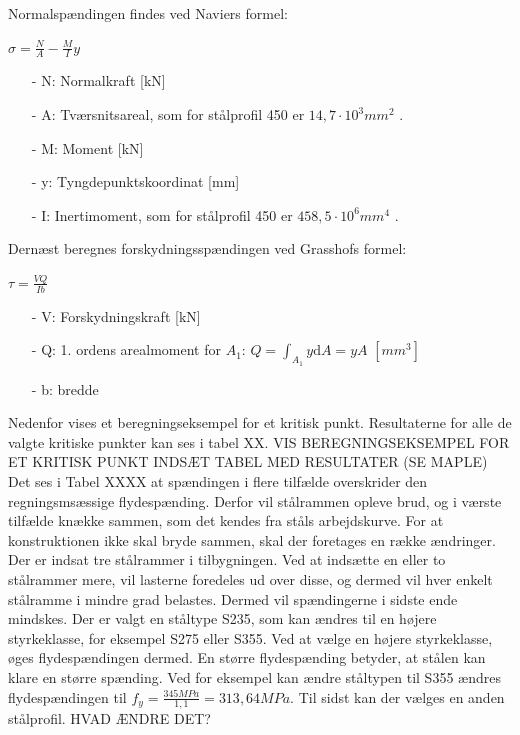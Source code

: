 Normalspændingen findes ved Naviers formel:

\begin{center}
	$\sigma = \frac{N}{A} - \frac{M}{I} y$
\end{center}

\begin{itemize}
	\item[-] N: Normalkraft [kN]
	\item[-] A: Tværsnitsareal, som for stålprofil 450 er $14,\!7 \cdot 10^3 mm^2$ \citep{stabi}. 
	\item[-] M: Moment [kN]
	\item[-] y: Tyngdepunktskoordinat [mm]
	\item[-] I: Inertimoment, som for stålprofil 450 er $458,\!5 \cdot 10^6 mm^4$ \citep{stabi}. 
\end{itemize} 

Dernæst beregnes forskydningsspændingen ved Grasshofs formel:

\begin{center}
	$\tau = \frac{VQ}{Ib}$
\end{center}

\begin{itemize}
	\item[-] V: Forskydningskraft [kN]
	\item[-] Q: 1. ordens arealmoment for $A_1$: $Q = \int_{A_1}y \mathrm{d}A = yA$ $[mm^3]$
	\item[-] b: bredde
\end{itemize}

Nedenfor vises et beregningseksempel for et kritisk punkt. Resultaterne for alle de valgte kritiske punkter kan ses i tabel XX. 
\newline
\newline
VIS BEREGNINGSEKSEMPEL FOR ET KRITISK PUNKT
\newline
\newline
INDSÆT TABEL MED RESULTATER (SE MAPLE) 
\newline
\newline
Det ses i Tabel XXXX at spændingen i flere tilfælde overskrider den regningsmsæssige flydespænding. Derfor vil stålrammen opleve brud, og i værste tilfælde knække sammen, som det kendes fra ståls arbejdskurve.
\newline 
\newline
For at konstruktionen ikke skal bryde sammen, skal der foretages en række ændringer.
\newline \indent{     }  Der er indsat tre stålrammer i tilbygningen. Ved at indsætte en eller to stålrammer mere, vil lasterne foredeles ud over disse, og dermed vil hver enkelt stålramme i mindre grad belastes. Dermed vil spændingerne i sidste ende mindskes. 
\newline \indent{     }  Der er valgt en ståltype S235, som kan ændres til en højere styrkeklasse, for eksempel S275 eller S355. Ved at vælge en højere styrkeklasse, øges flydespændingen dermed. En større flydespænding betyder, at stålen kan klare en større spænding. Ved for eksempel kan ændre ståltypen til S355 ændres flydespændingen til $f_y = \frac{345 MPa}{1,\!1} = 313,\!64 MPa$. 
\newline \indent{     }  Til sidst kan der vælges en anden stålprofil. HVAD ÆNDRE DET?